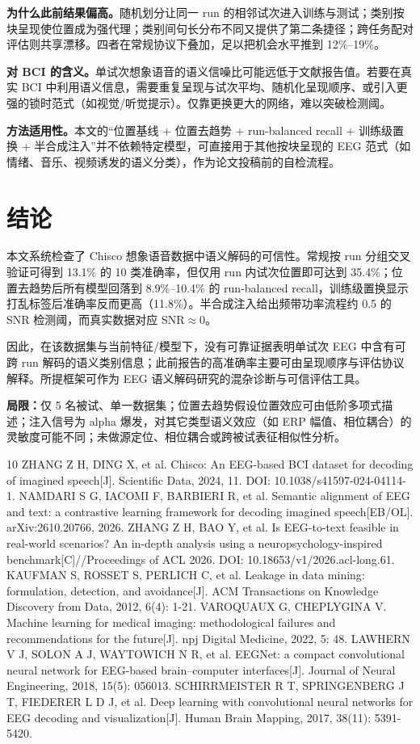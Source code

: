 \documentclass[twocolumn,10pt]{ctexart}
\begin{document}
\textbf{为什么此前结果偏高。}随机划分让同一 run 的相邻试次进入训练与测试；类别按块呈现使位置成为强代理；类别间句长分布不同又提供了第二条捷径；跨任务配对评估则共享漂移。四者在常规协议下叠加，足以把机会水平推到 12\%--19\%。

\textbf{对 BCI 的含义。}单试次想象语音的语义信噪比可能远低于文献报告值。若要在真实 BCI 中利用语义信息，需要重复呈现与试次平均、随机化呈现顺序、或引入更强的锁时范式（如视觉/听觉提示）。仅靠更换更大的网络，难以突破检测阈。

\textbf{方法适用性。}本文的“位置基线 + 位置去趋势 + run-balanced recall + 训练级置换 + 半合成注入”并不依赖特定模型，可直接用于其他按块呈现的 EEG 范式（如情绪、音乐、视频诱发的语义分类），作为论文投稿前的自检流程。

\section{结论}

本文系统检查了 Chisco 想象语音数据中语义解码的可信性。常规按 run 分组交叉验证可得到 13.1\% 的 10 类准确率，但仅用 run 内试次位置即可达到 35.4\%；位置去趋势后所有模型回落到 8.9\%--10.4\% 的 run-balanced recall，训练级置换显示打乱标签后准确率反而更高（11.8\%）。半合成注入给出频带功率流程约 0.5 的 SNR 检测阈，而真实数据对应 SNR$\approx0$。

因此，在该数据集与当前特征/模型下，没有可靠证据表明单试次 EEG 中含有可跨 run 解码的语义类别信息；此前报告的高准确率主要可由呈现顺序与评估协议解释。所提框架可作为 EEG 语义解码研究的混杂诊断与可信评估工具。

\textbf{局限：}仅 5 名被试、单一数据集；位置去趋势假设位置效应可由低阶多项式描述；注入信号为 alpha 爆发，对其它类型语义效应（如 ERP 幅值、相位耦合）的灵敏度可能不同；未做源定位、相位耦合或跨被试表征相似性分析。

\begin{thebibliography}{10}
\small
{} ZHANG Z H, DING X, et al. Chisco: An EEG-based BCI dataset for decoding of imagined speech[J]. Scientific Data, 2024, 11. DOI: 10.1038/s41597-024-04114-1.
 NAMDARI S G, IACOMI F, BARBIERI R, et al. Semantic alignment of EEG and text: a contrastive learning framework for decoding imagined speech[EB/OL]. arXiv:2610.20766, 2026.
 ZHANG Z H, BAO Y, et al. Is EEG-to-text feasible in real-world scenarios? An in-depth analysis using a neuropsychology-inspired benchmark[C]//Proceedings of ACL 2026. DOI: 10.18653/v1/2026.acl-long.61.
 KAUFMAN S, ROSSET S, PERLICH C, et al. Leakage in data mining: formulation, detection, and avoidance[J]. ACM Transactions on Knowledge Discovery from Data, 2012, 6(4): 1-21.
 VAROQUAUX G, CHEPLYGINA V. Machine learning for medical imaging: methodological failures and recommendations for the future[J]. npj Digital Medicine, 2022, 5: 48.
 LAWHERN V J, SOLON A J, WAYTOWICH N R, et al. EEGNet: a compact convolutional neural network for EEG-based brain--computer interfaces[J]. Journal of Neural Engineering, 2018, 15(5): 056013.
 SCHIRRMEISTER R T, SPRINGENBERG J T, FIEDERER L D J, et al. Deep learning with convolutional neural networks for EEG decoding and visualization[J]. Human Brain Mapping, 2017, 38(11): 5391-5420.
\end{thebibliography}
\end{document}

